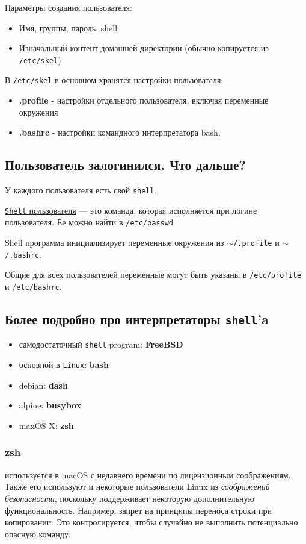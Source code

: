 Параметры создания пользователя:
\begin{itemize}
	\item Имя, группы, пароль, {shell}
	\item Изначальный контент домашней директории (обычно копируется из \texttt{/etc/skel})
\end{itemize}

В \texttt{/etc/skel} в основном хранятся настройки пользователя:
\begin{itemize}
	\item \textbf{.profile} - настройки отдельного пользователя, включая переменные окружения
	\item \textbf{.bashrc} - настройки командного интерпретатора bash.
\end{itemize}

\subsection{Пользователь залогинился. Что дальше?}

У каждого пользователя есть свой \texttt{shell}. 

\begin{Def}
	\underline{\texttt{Shell} пользователя} --- это команда, которая исполняется при логине пользователя. Ее можно найти в \texttt{/etc/passwd}
\end{Def}

Shell программа инициализирует переменные окружения из \texttt{$\sim$/.profile} и \texttt{$\sim$/.bashrc}.

Общие для всех пользователей переменные могут быть указаны в \texttt{/etc/profile} и /\texttt{etc/bashrc}.

\subsection{Более подробно про интерпретаторы \texttt{shell}'a} 

\begin{itemize}
	\item самодостаточный \texttt{shell} program: \textbf{FreeBSD}
	\item основной в \texttt{Linux}: \textbf{bash}
	\item debian: \textbf{dash}
	\item alpine: \textbf{busybox}
	\item maxOS X: \textbf{zsh}
\end{itemize}

\subsubsection{zsh} используется в macOS с недавнего времени по лицензионным соображениям. 
Также его используют и некоторые пользователи Linux из \textit{соображений безопасности}, поскольку поддерживает некоторую дополнительную функциональность. Например, запрет на принципы переноса строки при копировании. Это контролируется, чтобы случайно не выполнить потенциально опасную команду. 

